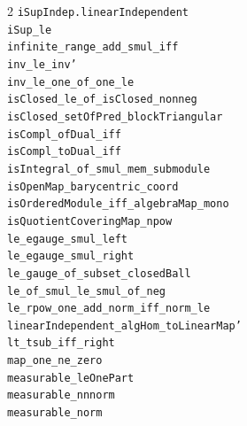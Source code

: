 \documentclass[10pt,a4paper]{article}
\begin{document}
\begin{multicols}{2}
\texttt{iSupIndep.\allowbreak{}linearIndependent} \\
\texttt{iSup\_le} \\
\texttt{infinite\_range\_add\_smul\_iff} \\
\texttt{inv\_le\_inv'} \\
\texttt{inv\_le\_one\_of\_one\_le} \\
\texttt{isClosed\_le\_of\_isClosed\_nonneg} \\
\texttt{isClosed\_setOfPred\_blockTriangular} \\
\texttt{isCompl\_ofDual\_iff} \\
\texttt{isCompl\_toDual\_iff} \\
\texttt{isIntegral\_of\_smul\_mem\_submodule} \\
\texttt{isOpenMap\_barycentric\_coord} \\
\texttt{isOrderedModule\_iff\_algebraMap\_mono} \\
\texttt{isQuotientCoveringMap\_npow} \\
\texttt{le\_egauge\_smul\_left} \\
\texttt{le\_egauge\_smul\_right} \\
\texttt{le\_gauge\_of\_subset\_closedBall} \\
\texttt{le\_of\_smul\_le\_smul\_of\_neg} \\
\texttt{le\_rpow\_one\_add\_norm\_iff\_norm\_le} \\
\texttt{linearIndependent\_algHom\_toLinearMap'} \\
\texttt{lt\_tsub\_iff\_right} \\
\texttt{map\_one\_ne\_zero} \\
\texttt{measurable\_leOnePart} \\
\texttt{measurable\_nnnorm} \\
\texttt{measurable\_norm} \\

\end{multicols}
\end{document}
